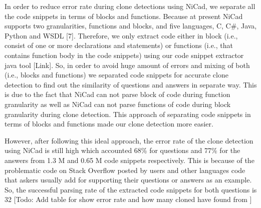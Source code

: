 \documentclass[conference]{IEEEtran}
\begin{document}
	In order to reduce error rate during clone detections using NiCad, we separate all the code snippets in terms of blocks and functions. Because at present NiCad supports two granularities, functions and blocks, and five languages, C, C\#, Java, Python and WSDL [7]. Therefore, we only extract code either in block (i.e., consist of one or more declarations and statements) or functions (i.e., that contains function body in the code snippets) using our code snippet extractor java tool [Link]. So, in order to avoid huge amount of errors and mixing of both (i.e., blocks and functions) we separated code snippets for accurate clone detection to find out the similarity of questions and answers in separate way. This is due to the fact that NiCad can not parse block of code during function granularity as well as NiCad can not parse functions of code during block granularity during clone detection. This approach of separating code snippets in terms of blocks and functions made our clone detection more easier. 
	
	However, after following this ideal approach, the error rate of the clone detection using NiCad is still high which accounted 68\% for questions and 77\% for the answers from 1.3 M and 0.65 M code snippets respectively. This is because of the problematic code on Stack Overflow posted by users and other languages code that askers usually add for supporting their questions or answers as an example. So, the successful parsing rate of the extracted code snippets for both questions is 32%
	[Todo: Add table for show error rate and how many cloned have found from ]
	
\end{document}
